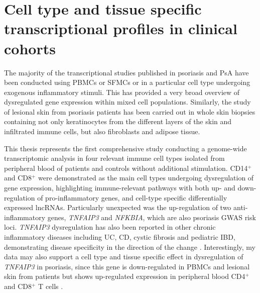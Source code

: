 




\section{Cell type and tissue specific transcriptional profiles in clinical cohorts}

The majority of the transcriptional studies published in psoriasis and PsA have been conducted using PBMCs or SFMCs or in a particular cell type undergoing exogenous inflammatory stimuli. This has provided a very broad overview of dysregulated gene expression within mixed cell populations. Similarly, the study of lesional skin from psoriasis patients has been carried out in whole skin biopsies containing not only keratinocytes from the different layers of the skin and infiltrated immune cells, but also fibroblasts and adipose tissue. 

This thesis represents the first comprehensive study conducting a genome-wide transcriptomic analysis in four relevant immune cell types isolated from peripheral blood of patients and controls without additional stimulation. CD14$^+$ and CD8$^+$ were demonstrated as the main cell types undergoing dysregulation of gene expression, highlighting immune-relevant pathways with both up- and down-regulation of pro-inflammatory genes, and cell-type specific differentially expressed lncRNAs. Particularly unexpected was the up-regulation of two anti-inflammatory genes, \textit{TNFAIP3} and \textit{NFKBIA}, which are also psoriasis GWAS risk loci. \textit{TNFAIP3} dysregulation has also been reported in other chronic inflammatory diseases including UC, CD, cystic fibrosis and pediatric IBD, demonstrating disease specificity in the direction of the change \parencite{Jiang2012,Majumdar2017,Sahlol2019}. Interestingly, my data may also support a cell type and tissue specific effect in dysregulation of \textit{TNFAIP3} in psoriasis, since this gene is down-regulated in PBMCs and lesional skin from patients but shows up-regulated expression in peripheral blood CD4$^+$ and CD8$^+$ T cells \parencite{Jiang2012,Sahlol2019}.

